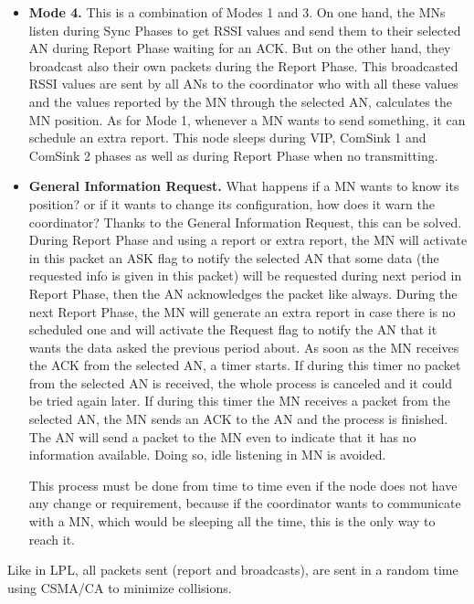 \begin{itemize}
 \item \textbf{Mode 4.} This is a combination of Modes 1 and 3. On one hand, the \acp{MN} listen during Sync Phases to get \ac{RSSI} values and send them
to their selected \ac{AN} during Report Phase waiting for an \ac{ACK}. But on the other hand, they broadcast also their own packets during the Report Phase.
This broadcasted \ac{RSSI} values are sent by all \acp{AN} to the coordinator who with all these values and the values reported by the \ac{MN} through the 
selected \ac{AN}, calculates the \ac{MN} position. As for Mode 1, whenever a \ac{MN} wants to send something, it can schedule an extra report. This node sleeps
during \ac{VIP}, ComSink 1 and ComSink 2 phases as well as during Report Phase when no transmitting.

 \item \textbf{General Information Request.} What happens if a \ac{MN} wants to know its position? or if it wants to change its configuration, how does it
warn the coordinator? Thanks to the General Information Request, this can be solved. During Report Phase and using a report or extra report, the \ac{MN}
will activate in this packet an ASK flag to notify the selected \ac{AN} that some data (the requested info is given in this packet) will be requested 
during next period in Report Phase, then the \ac{AN} acknowledges the packet like always. During the next Report Phase, the \ac{MN} will generate an extra
report in case there is no scheduled one and will activate the Request flag to notify the \ac{AN} that it wants the data asked the previous period about. As soon
as the \ac{MN} receives the \ac{ACK} from the selected \ac{AN}, a timer starts. If during this timer no packet from the selected \ac{AN} is received, the whole
process is canceled and it could be tried again later. If during this timer the \ac{MN} receives a packet from the selected \ac{AN}, the \ac{MN} sends an
\ac{ACK} to the \ac{AN} and the process is finished. The \ac{AN} will send a packet to the \ac{MN} even to indicate that it has no information available.
Doing so, idle listening in \ac{MN} is avoided.

This process must be done from time to time even if the node does not have any change or requirement, because if the coordinator wants to communicate with a
\ac{MN}, which would be sleeping all the time, this is the only way to reach it.
\end{itemize}

Like in \ac{LPL}, all packets sent (report and broadcasts), are sent in a random time using \ac{CSMA/CA} to minimize collisions.

